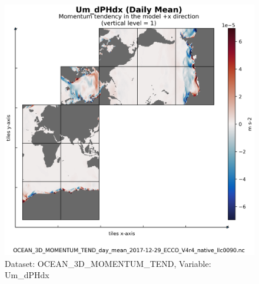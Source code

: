 \begin{figure}[H]
\centering
\includegraphics[scale=0.55]{../images/plots/native_plots/Ocean_Three-Dimensional_Momentum_Tendency/Um_dPHdx.png}
\caption{Dataset: OCEAN\_3D\_MOMENTUM\_TEND, Variable: Um\_dPHdx}
\label{tab:table-OCEAN_3D_MOMENTUM_TEND_Um_dPHdx-Plot}
\end{figure}
\newpage
\pagebreak
